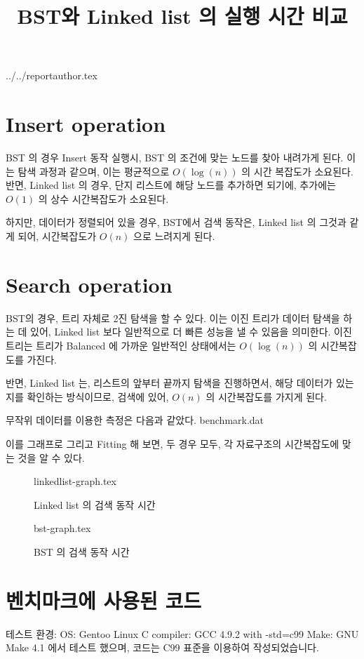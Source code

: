\documentclass {article}
\begin{document}
\title {BST와 Linked list 의 실행 시간 비교}
 {../../reportauthor.tex}
\maketitle

\section {Insert operation}
BST 의 경우 Insert 동작 실행시, BST 의 조건에 맞는 노드를 찾아 내려가게 된다. 이는 탐색 과정과 같으며, 이는 평균적으로 $ O(\log(n)) $ 의 시간 복잡도가 소요된다. 반면, Linked list 의 경우, 단지 리스트에 해당 노드를 추가하면 되기에, 추가에는 $ O(1) $ 의 상수 시간복잡도가 소요된다.

하지만, 데이터가 정렬되어 있을 경우, BST에서 검색 동작은, Linked list 의 그것과 같게 되어, 시간복잡도가 $ O(n) $ 으로 느려지게 된다.

\section {Search operation}
BST의 경우, 트리 자체로 2진 탐색을 할 수 있다. 이는 이진 트리가 데이터 탐색을 하는 데 있어, Linked list 보다 일반적으로 더 빠른 성능을 낼 수 있음을 의미한다. 이진 트리는 트리가 Balanced 에 가까운 일반적인 상태에서는 $ O(\log(n)) $ 의 시간복잡도를 가진다.

반면, Linked list 는, 리스트의 앞부터 끝까지 탐색을 진행하면서, 해당 데이터가 있는지를 확인하는 방식이므로, 검색에 있어, $ O(n) $ 의 시간복잡도를 가지게 된다.

무작위 데이터를 이용한 측정은 다음과 같았다.
{benchmark.dat}

이를 그래프로 그리고 Fitting 해 보면, 두 경우 모두, 각 자료구조의 시간복잡도에 맞는 것을 알 수 있다. 

\begin {figure}
  \centering
   {linkedlist-graph.tex}
  \caption {Linked list 의 검색 동작 시간}
  \label{fig:linkedlist}
\end {figure}

\begin {figure}
  \centering
   {bst-graph.tex}
  \caption {BST 의 검색 동작 시간}
  \label{fig:bst}
\end {figure}

\section {벤치마크에 사용된 코드}
테스트 환경:
OS: Gentoo Linux 
C compiler: GCC 4.9.2 with -std=c99
Make: GNU Make 4.1
에서 테스트 했으며, 코드는 C99 표준을 이용하여 작성되었습니다.
\end{document}
